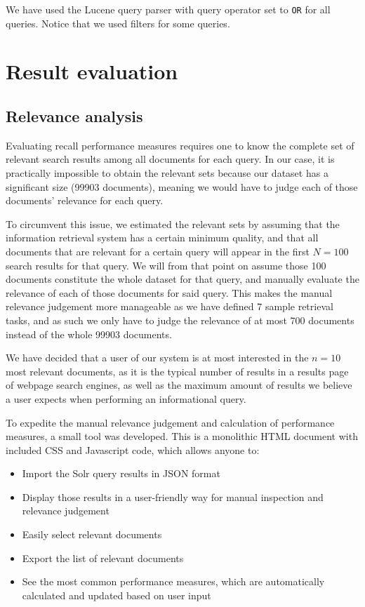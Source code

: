 \documentclass[sigconf, authorversion]{acmart}
\begin{document}
We have used the Lucene query parser with query operator set to \texttt{OR} for all queries. Notice that we used filters for some queries.

\section{Result evaluation}

\subsection{Relevance analysis} \label{sec:relevance-analysis}

Evaluating recall performance measures requires one to know the complete set of relevant search results among all documents for each query. In our case, it is practically impossible to obtain the relevant sets because our dataset has a significant size (\SI{99903}{} documents), meaning we would have to judge each of those documents' relevance for each query.

To circumvent this issue, we estimated the relevant sets by assuming that the information retrieval system has a certain minimum quality, and that all documents that are relevant for a certain query will appear in the first $N = 100$ search results for that query. We will from that point on assume those \SI{100}{} documents constitute the whole dataset for that query, and manually evaluate the relevance of each of those documents for said query. This makes the manual relevance judgement more manageable as we have defined 7 sample retrieval tasks, and as such we only have to judge the relevance of at most 700 documents instead of the whole \SI{99903}{} documents.

We have decided that a user of our system is at most interested in the $n=10$ most relevant documents, as it is the typical number of results in a results page of webpage search engines, as well as the maximum amount of results we believe a user expects when performing an informational query.

To expedite the manual relevance judgement and calculation of performance measures, a small tool was developed. This is a monolithic HTML document with included CSS and Javascript code, which allows anyone to:
\begin{itemize}
    \item Import the Solr query results in JSON format
    \item Display those results in a user-friendly way for manual inspection and relevance judgement
    \item Easily select relevant documents
    \item Export the list of relevant documents
    \item See the most common performance measures, which are automatically calculated and updated based on user input
\end{itemize}
\end{document}
